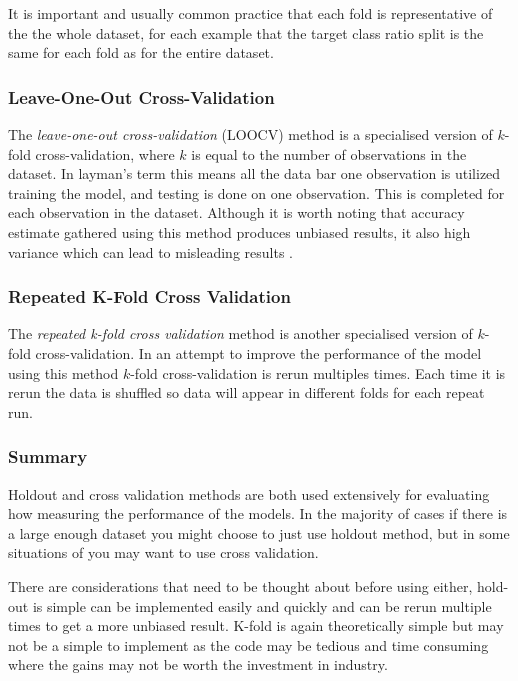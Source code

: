 It is important and usually common practice that each fold is representative of the the whole dataset, for each example that the target class ratio split is the same for each fold as for the entire dataset. 

\subsubsection{Leave-One-Out Cross-Validation}
The \textit{leave-one-out cross-validation} (LOOCV) method is a specialised version of $k$-fold cross-validation, where $k$ is equal to the number of observations in the dataset. In layman's term this means all the data bar one observation is utilized training the model, and testing is done on one observation. This is completed for each observation in the dataset. Although it is worth noting that accuracy estimate gathered using this method produces unbiased results, it also high variance which can lead to misleading results \citep{refaeilzadeh_cross-validation_2009}.
 

\subsubsection{Repeated K-Fold Cross Validation}
The \textit{repeated k-fold cross validation} method is another specialised version of $k$-fold cross-validation. In an attempt to improve the performance of the model using this method $k$-fold cross-validation is rerun multiples times. Each time it is rerun the data is shuffled so data will appear in different folds for each repeat run. 

\subsubsection{Summary}

Holdout and cross validation methods are both used extensively for evaluating how measuring the performance of the models. In the majority of cases if there is a large enough dataset you might choose to just use holdout method, but in some situations of you may want to use cross validation.

There are considerations that need to be thought about before using either, hold-out is simple can be implemented easily and quickly and can be rerun multiple times to get a more unbiased result. K-fold is again theoretically simple but may not be a simple to implement as the code may be tedious and time consuming where the gains may not be worth the investment in industry. 

